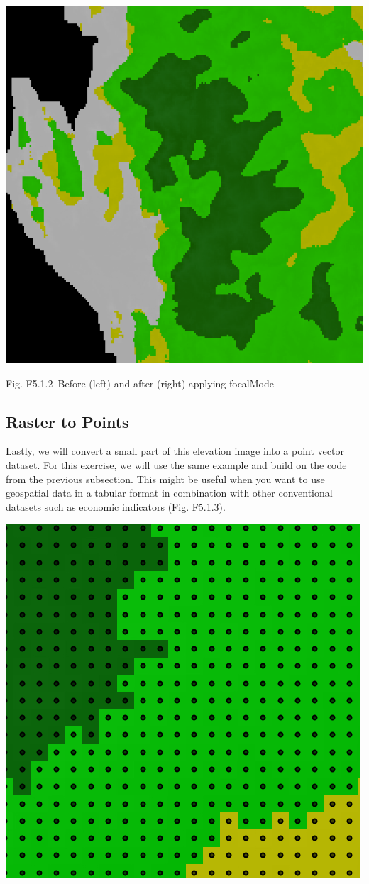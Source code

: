 \documentclass[
  letterpaper,
  DIV=11,
  numbers=noendperiod]{scrreprt}
\begin{document}
\includegraphics{./F5/image37.png}

Fig. F5.1.2~Before (left) and after (right) applying focalMode

\hypertarget{raster-to-points}{%
\subsection{Raster to Points}\label{raster-to-points}}

Lastly, we will convert a small part of this elevation image into a
point vector dataset. For this exercise, we will use the same example
and build on the code from the previous subsection. This might be useful
when you want to use geospatial data in a tabular format in combination
with other conventional datasets such as economic indicators (Fig.
F5.1.3).

\includegraphics{./F5/image24.png}
\end{document}
